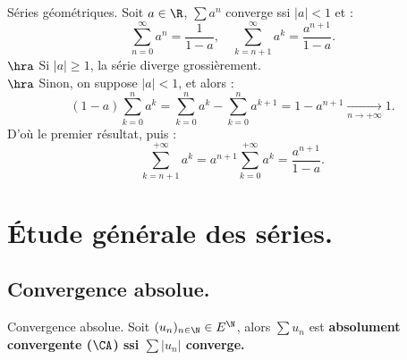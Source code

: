 \documentclass[11pt]{article}
\begin{document}
\vspace*{-0.7cm}

\begin{rappel}{Séries géométriques.}{}
    Soit $a\in \R$, $\sum a^n$ converge ssi $|a|<1$ et :
    \begin{equation*}
        \sum_{n=0}^\infty a^n = \frac{1}{1-a}, \quad \sum_{k=n+1}^\infty a^k = \frac{a^{n+1}}{1-a}.
    \end{equation*}
    \tcblower
    $\hra$ Si $|a|\geq1$, la série diverge grossièrement.\\
    $\hra$ Sinon, on suppose $|a|<1$, et alors :
    \begin{equation*}
        (1-a)\sum_{k=0}^n a^k = \sum_{k=0}^n a^k - \sum_{k=0}^na^{k+1} = 1 - a^{n+1} \xrightarrow[n\to+\infty]{}1.
    \end{equation*}
    D'où le premier résultat, puis :
    \begin{equation*}
        \sum_{k=n+1}^{+\infty}a^k = a^{n+1}\sum_{k=0}^{+\infty}a^k = \frac{a^{n+1}}{1-a}.
    \end{equation*}
\end{rappel}

\pagebreak

\section{Étude générale des séries.}

\subsection{Convergence absolue.}

\begin{defi}{Convergence absolue.}{}
    Soit $(u_n)_{n\in\N}\in E^\N$, alors $\sum u_n$ est \bf{absolument convergente} ($\CA$) ssi $\sum|u_n|$ converge.
\end{defi}

\vspace*{-0.7cm}
\end{document}
